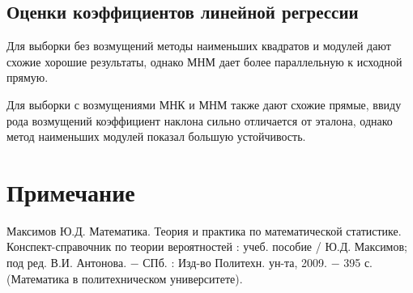 \documentclass[a4paper,12pt]{article} %
\begin{document}
\subsection{Оценки коэффициентов линейной регрессии}
Для выборки без возмущений методы наименьших квадратов и модулей дают схожие хорошие результаты, однако МНМ дает более параллельную к исходной прямую.

Для выборки с возмущениями МНК и МНМ также дают схожие прямые, ввиду рода возмущений коэффициент наклона сильно отличается от эталона, однако метод наименьших модулей показал большую устойчивость.
\newpage
\section*{Примечание}
\begin{thebibliography}{9}
 Максимов Ю.Д. Математика. Теория и практика по математической статистике. Конспект-справочник по теории вероятностей : учеб. пособие /
Ю.Д. Максимов; под ред. В.И. Антонова. $-$ СПб. : Изд-во Политехн.
ун-та, 2009. $-$ 395 с. (Математика в политехническом университете).
\end{thebibliography}
\end{document}
